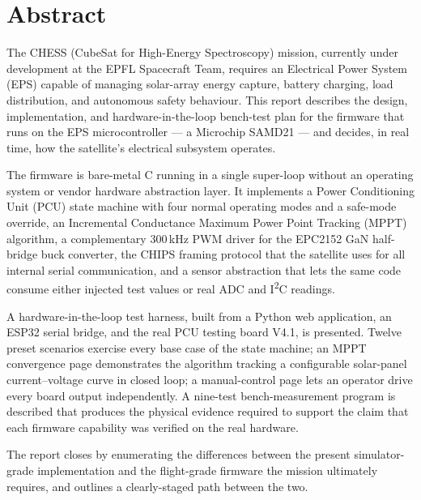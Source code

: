 \section*{Abstract}

The CHESS (CubeSat for High-Energy Spectroscopy) mission, currently
under development at the EPFL Spacecraft Team, requires an Electrical
Power System (EPS) capable of managing solar-array energy capture,
battery charging, load distribution, and autonomous safety
behaviour. This report describes the design, implementation, and
hardware-in-the-loop bench-test plan for the firmware that runs on
the EPS microcontroller --- a Microchip SAMD21 --- and decides, in
real time, how the satellite's electrical subsystem operates.

The firmware is bare-metal C running in a single super-loop without
an operating system or vendor hardware abstraction layer. It
implements a Power Conditioning Unit (PCU) state machine with four
normal operating modes and a safe-mode override, an Incremental
Conductance Maximum Power Point Tracking (MPPT) algorithm, a
complementary 300\,kHz PWM driver for the EPC2152 GaN half-bridge
buck converter, the CHIPS framing protocol that the satellite uses
for all internal serial communication, and a sensor abstraction that
lets the same code consume either injected test values or real ADC
and I\textsuperscript{2}C readings.

A hardware-in-the-loop test harness, built from a Python web
application, an ESP32 serial bridge, and the real PCU testing board
V4.1, is presented. Twelve preset scenarios exercise every base case
of the state machine; an MPPT convergence page demonstrates the
algorithm tracking a configurable solar-panel current--voltage curve
in closed loop; a manual-control page lets an operator drive every
board output independently. A nine-test bench-measurement program is
described that produces the physical evidence required to support
the claim that each firmware capability was verified on the real
hardware.

The report closes by enumerating the differences between the present
simulator-grade implementation and the flight-grade firmware the
mission ultimately requires, and outlines a clearly-staged path
between the two.
